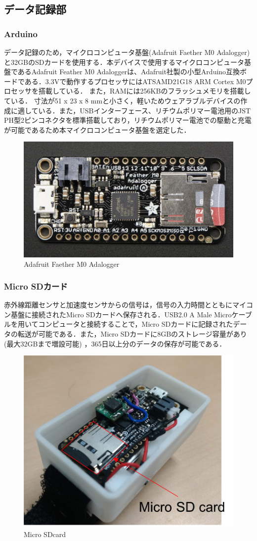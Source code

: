 \subsection*{データ記録部}
\subsubsection*{Arduino}
データ記録のため，マイクロコンピュータ基盤(Adafruit Faether M0 Adalogger)\cite{Utc2018}と32GBのSDカードを使用する．本デバイスで使用するマイクロコンピュータ基盤であるAdafruit Feather M0 Adaloggerは、Adafruit社製の小型Arduino互換ボードである．3.3Vで動作するプロセッサにはATSAMD21G18 ARM Cortex M0プロセッサを搭載している．
また，RAMには256KBのフラッシュメモリを搭載している．
寸法が51 x 23 x 8 mmと小さく，軽いためウェアラブルデバイスの作成に適している．また，USBインターフェース、リチウムポリマー電池用のJST PH型2ピンコネクタを標準搭載しており，リチウムポリマー電池での駆動と充電が可能であるため本マイクロコンピュータ基盤を選定した．

\begin{figure}[H]
  \centering
  \includegraphics[width=0.5\linewidth]{fig/adafruit}
  \caption{Adafruit Faether M0 Adalogger\cite{Utc2018}}
  \label{fig:adafruit}
\end{figure}

\subsubsection*{Micro SDカード}
赤外線距離センサと加速度センサからの信号は，信号の入力時間とともにマイコン基盤に接続されたMicro SDカードへ保存される．USB2.0 A Male Microケーブルを用いてコンピュータと接続することで，Micro SDカードに記録されたデータの転送が可能である．また，Micro SDカードに8GBのストレージ容量があり(最大32GBまで増設可能)
，365日以上分のデータの保存が可能である．


\begin{figure}[H]
  \centering
  \includegraphics[width=0.5\linewidth]{fig/microsdcard}
  \caption{Micro SDcard}
  \label{fig:sd card}
\end{figure}


